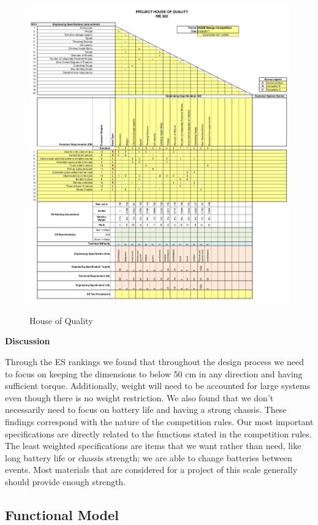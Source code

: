 \documentclass[12pt,letterpaper,titlepage]{article}
\begin{document}
\begin{figure}[h]
	\centering
	\includegraphics[width=5in]{images/HOQ-1}
	\label{fig:HOQ}
	\caption{House of Quality}
\end{figure}


\smallskip\noindent\textbf{Discussion}

Through the ES rankings we found that throughout the design process we need to focus on keeping the dimensions to below 50 cm in any direction and having sufficient torque. Additionally, weight will need to be accounted for large systems even though there is no weight restriction. We also found that we don't necessarily need to focus on battery life and having a strong chassis. These findings correspond with the nature of the competition rules. Our most important specifications are directly related to the functions stated in the competition rules. The least weighted specifications are items that we want rather than need, like long battery life or chassis strength; we are able to change batteries between events. Most materials that are considered for a project of this scale generally should provide enough strength.

\subsection{Functional Model}
\end{document}
